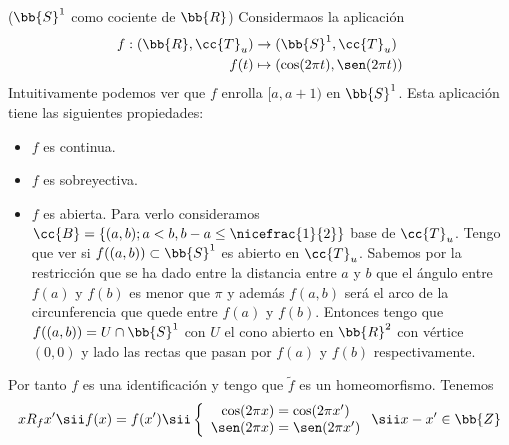 \begin{ejemplo}($\bb{S}^1$ como cociente de $\bb{R}$)
    Considermaos la aplicación
    \begin{align*}
        f:(\bb{R}, \cc{T}_u)&\to (\bb{S}^1, \cc{T}_u)\\
        f(t) & \mapsto (\cos(2\pi t), \sen (2\pi t))
    \end{align*}
    Intuitivamente podemos ver que $f$ enrolla $[a,a+1)$ en $\bb{S}^1$.
    Esta aplicación tiene las siguientes propiedades:
    \begin{itemize}
        \item $f$ es continua.
        \item $f$ es sobreyectiva.
        \item $f$ es abierta. Para verlo consideramos $\cc{B}=\{(a,b); a<b, b-a \leq \nicefrac{1}{2}\}$ base de $\cc{T}_u$. Tengo que ver si $f((a,b))\subset \bb{S}^1$ es abierto en $\cc{T}_u$. Sabemos por la restricción que se ha dado entre la distancia entre $a$ y $b$ que el ángulo entre $f(a)$ y $f(b)$ es menor que $\pi$ y además $f(a,b)$ será el arco de la circunferencia que quede entre $f(a)$ y $f(b)$. Entonces tengo que $f((a,b)) = U\cap \bb{S}^1$ con $U$ el cono abierto en $\bb{R}^2$ con vértice $(0,0)$ y lado las rectas que pasan por $f(a)$ y $f(b)$ respectivamente.
    \end{itemize}

    Por tanto $f$ es una identificación y tengo que $\tilde{f}$ es un homeomorfismo. Tenemos 
    \begin{align*}
        xR_fx' \sii f(x)=f(x') \sii \left\{
        \begin{array}{c}
            \cos(2\pi x) = \cos(2\pi x')\\
            \sen(2\pi x) = \sen(2\pi x')
        \end{array}
        \right. \sii x-x'\in \bb{Z}
    \end{align*}
    \endsquare
 \end{ejemplo}


